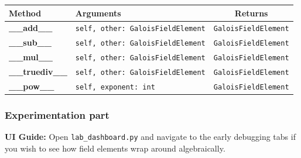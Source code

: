 \begin{center}
\renewcommand{\arraystretch}{1.5}
\begin{tabularx}{\textwidth}{@{} >{\bfseries}l X c @{}}
\toprule
Method & Arguments & Returns \\ \midrule
\_\_add\_\_ & \lstinline|self, other: GaloisFieldElement| & \lstinline|GaloisFieldElement| \\
\_\_sub\_\_ & \lstinline|self, other: GaloisFieldElement| & \lstinline|GaloisFieldElement| \\
\_\_mul\_\_ & \lstinline|self, other: GaloisFieldElement| & \lstinline|GaloisFieldElement| \\
\_\_truediv\_\_ & \lstinline|self, other: GaloisFieldElement| & \lstinline|GaloisFieldElement| \\
\_\_pow\_\_ & \lstinline|self, exponent: int| & \lstinline|GaloisFieldElement| \\
\bottomrule
\end{tabularx}
\end{center}

\subsubsection*{Experimentation part}
\textbf{UI Guide:} Open \lstinline|lab_dashboard.py| and navigate to the early debugging tabs if you wish to see how field elements wrap around algebraically.

\vspace{1cm}
